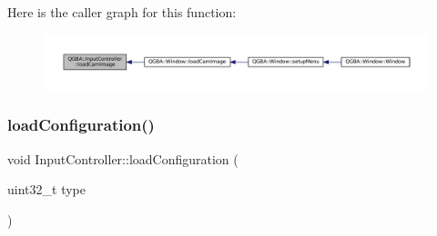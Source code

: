 Here is the caller graph for this function\+:
\nopagebreak
\begin{figure}[H]
\begin{center}
\leavevmode
\includegraphics[width=350pt]{class_q_g_b_a_1_1_input_controller_aee5be199d0effc2fd468611bdc9a9ef5_icgraph}
\end{center}
\end{figure}
\mbox{\label{class_q_g_b_a_1_1_input_controller_ad008a966ed0e680b06f1883bbfb0829d}} 
\subsubsection{\texorpdfstring{load\+Configuration()}{loadConfiguration()}}
{\footnotesize\ttfamily void Input\+Controller\+::load\+Configuration (\begin{DoxyParamCaption}\item[{uint32\+\_\+t}]{type }\end{DoxyParamCaption})}

